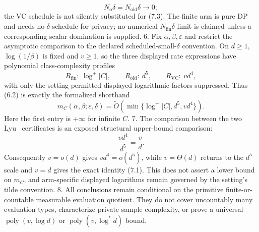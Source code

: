 \begin{proposition}
\[   N_{\mathrm o}\delta=N_{\mathrm{old}}\delta\to0;
   \tag{7.3}
   \]
   the VC schedule is not silently substituted for (7.3). The finite arm is
   pure DP and needs no \(\delta\)-schedule for privacy; no numerical
   \(N_{\mathrm{fin}}\delta\) limit is claimed unless a corresponding scalar
   domination is supplied.
6. Fix \(\alpha,\beta,\varepsilon\) and restrict the
   asymptotic comparison to the declared scheduled-small-\(\delta\)
   convention. On \(d\ge1\), \(\log(1/\beta)\) is fixed and \(v\ge1\), so
   the three displayed rate expressions have polynomial class-complexity
   profiles
   \[
   R_{\mathrm{fin}}:\ \log^+|C|,
   \qquad
   R_{\mathrm{old}}:\ d^5,
   \qquad
   R_{\mathrm{VC}}:\ vd^4,
   \tag{7.4}
   \]
   with only the setting-permitted displayed logarithmic factors suppressed.
   Thus (6.2) is exactly the formalized shorthand
   \[
   m_C(\alpha,\beta;\varepsilon,\delta)
   =\widetilde O\!\left(
   \min\{\log^+|C|,d^5,vd^4\}
   \right).
   \tag{7.5}
   \]
   Here the first entry is \(+\infty\) for infinite \(C\).
7. The comparison between the two Lyu~\citep{lyu2025} certificates is an exposed structural
   upper-bound comparison:
   \[
   \frac{vd^4}{d^5}=\frac vd.
   \tag{7.6}
   \]
   Consequently \(v=o(d)\) gives \(vd^4=o(d^5)\), while
   \(v=\Theta(d)\) returns to the \(d^5\) scale and \(v=d\) gives the exact
   identity (7.1). This does not assert a lower bound on \(m_C\), and
   arm-specific displayed logarithms remain governed by the setting's tilde
   convention.
8. All conclusions remain conditional on the primitive finite-or-countable
   measurable evaluation quotient. They do not cover uncountably many
   evaluation types, characterize private sample complexity, or prove a
   universal \(\operatorname{poly}(v,\log d)\) or
   \(\operatorname{poly}(v,\log^*d)\) bound.


\end{proposition}

